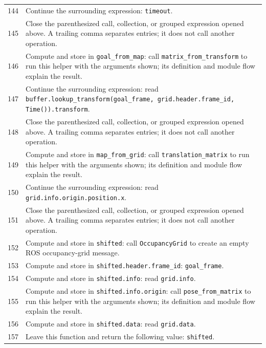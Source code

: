 \documentclass[11pt,a4paper]{book}
\begin{document}
\begin{longtable}{r p{}}
144 & Continue the surrounding expression: \texttt{timeout}. \\

145 & Close the parenthesized call, collection, or grouped expression opened above. A trailing comma separates entries; it does not call another operation. \\

146 & Compute and store in \texttt{goal\_from\_map}: call \texttt{matrix\_from\_transform} to run this helper with the arguments shown; its definition and module flow explain the result.  \\

147 & Continue the surrounding expression: read \texttt{buffer.lookup\_transform(goal\_frame, grid.header.frame\_id, Time()).transform}. \\

148 & Close the parenthesized call, collection, or grouped expression opened above. A trailing comma separates entries; it does not call another operation. \\

149 & Compute and store in \texttt{map\_from\_grid}: call \texttt{translation\_matrix} to run this helper with the arguments shown; its definition and module flow explain the result.  \\

150 & Continue the surrounding expression: read \texttt{grid.info.origin.position.x}. \\

151 & Close the parenthesized call, collection, or grouped expression opened above. A trailing comma separates entries; it does not call another operation. \\

152 & Compute and store in \texttt{shifted}: call \texttt{OccupancyGrid} to create an empty ROS occupancy-grid message.  \\

153 & Compute and store in \texttt{shifted.header.frame\_id}: \texttt{goal\_frame}.  \\

154 & Compute and store in \texttt{shifted.info}: read \texttt{grid.info}.  \\

155 & Compute and store in \texttt{shifted.info.origin}: call \texttt{pose\_from\_matrix} to run this helper with the arguments shown; its definition and module flow explain the result.  \\

156 & Compute and store in \texttt{shifted.data}: read \texttt{grid.data}.  \\

157 & Leave this function and return the following value: \texttt{shifted}. \\

\end{longtable}
\end{document}

